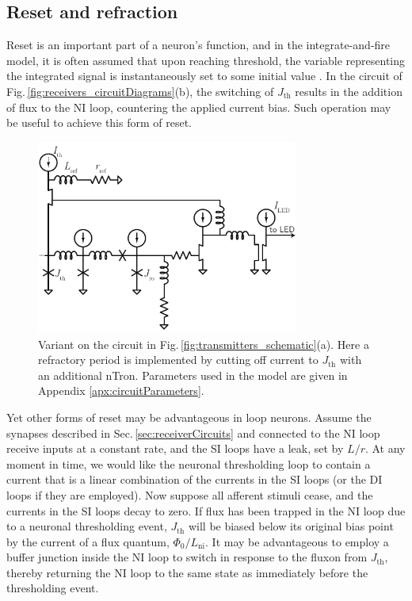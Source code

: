 \documentclass[twocolumn]{article}
\begin{document}
\subsection{\label{sec:refraction}Reset and refraction}
Reset is an important part of a neuron's function, and in the integrate-and-fire model, it is often assumed that upon reaching threshold, the variable representing the integrated signal is instantaneously set to some initial value \cite{daab2001,geki2002}. In the circuit of Fig.\,\ref{fig:receivers_circuitDiagrams}(b), the switching of $J_{\mathrm{th}}$ results in the addition of flux to the NI loop, countering the applied current bias. Such operation may be useful to achieve this form of reset. 
\begin{figure}[t!]
	\centerline{\includegraphics[width=8.6cm]{_transmitters_threshold_circuit_small.pdf}}
	\caption{\label{fig:transmitters_threshold_circuit}Variant on the circuit in Fig.\,\ref{fig:transmitters_schematic}(a). Here a refractory period is implemented by cutting off current to $J_{\mathrm{th}}$ with an additional nTron. Parameters used in the model are given in Appendix \ref{apx:circuitParameters}.}
\end{figure}

Yet other forms of reset may be advantageous in loop neurons. Assume the synapses described in Sec.\,\ref{sec:receiverCircuits} and connected to the NI loop receive inputs at a constant rate, and the SI loops have a leak, set by $L/r$. At any moment in time, we would like the neuronal thresholding loop to contain a current that is a linear combination of the currents in the SI loops (or the DI loops if they are employed). Now suppose all afferent stimuli cease, and the currents in the SI loops decay to zero. If flux has been trapped in the NI loop due to a neuronal thresholding event, $J_{\mathrm{th}}$ will be biased below its original bias point by the current of a flux quantum, $\Phi_0/L_{\mathrm{ni}}$. It may be advantageous to employ a buffer junction inside the NI loop to switch in response to the fluxon from $J_{\mathrm{th}}$, thereby returning the NI loop to the same state as immediately before the thresholding event. 
\end{document}
